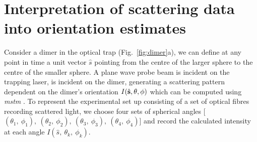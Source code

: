 \section{Interpretation of scattering data into orientation estimates}
Consider a dimer in the optical trap (Fig.~\ref{fig:dimer}a), we can define at any 
point in time a unit vector $\hat{s}$ pointing from the centre of the larger sphere 
to the centre of the smaller sphere. A plane wave probe beam is incident on 
the trapping laser, is incident on the dimer, generating a scattering pattern
dependent on the dimer's orientation $I(\hat{\bf s}, \theta, \phi)$ which can be 
computed using \textit{mstm} \cite{I.Mishchenko1996}. To represent the experimental 
set up consisting of a set of optical fibres recording scattered light, we choose 
four sets of spherical angles [$(\theta_1,\ \phi_1), \ (\theta_2,\ \phi_2), \ 
(\theta_3, \ \phi_3), \ (\theta_4,\ \phi_4)$] and record the calculated intensity 
at each angle $I(\hat{s},\ \theta_k,\ \phi_k)$. 

